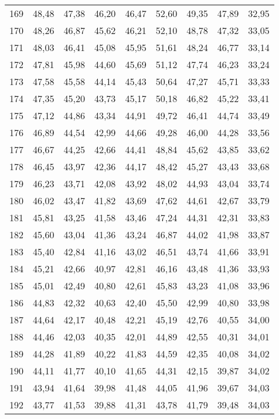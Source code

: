 \begin{longtable}{c c c c c c c c c}
169	& 48,48	& 47,38	& 46,20	& 46,47	& 52,60	& 49,35	& 47,89	& 32,95 \\
170	& 48,26	& 46,87	& 45,62	& 46,21	& 52,10	& 48,78	& 47,32	& 33,05 \\
171	& 48,03	& 46,41	& 45,08	& 45,95	& 51,61	& 48,24	& 46,77	& 33,14 \\
172	& 47,81	& 45,98	& 44,60	& 45,69	& 51,12	& 47,74	& 46,23	& 33,24 \\
173	& 47,58	& 45,58	& 44,14	& 45,43	& 50,64	& 47,27	& 45,71	& 33,33 \\
174	& 47,35	& 45,20	& 43,73	& 45,17	& 50,18	& 46,82	& 45,22	& 33,41 \\
175	& 47,12	& 44,86	& 43,34	& 44,91	& 49,72	& 46,41	& 44,74	& 33,49 \\
176	& 46,89	& 44,54	& 42,99	& 44,66	& 49,28	& 46,00	& 44,28	& 33,56 \\
177	& 46,67	& 44,25	& 42,66	& 44,41	& 48,84	& 45,62	& 43,85	& 33,62 \\
178	& 46,45	& 43,97	& 42,36	& 44,17	& 48,42	& 45,27	& 43,43	& 33,68 \\
179	& 46,23	& 43,71	& 42,08	& 43,92	& 48,02	& 44,93	& 43,04	& 33,74 \\
180	& 46,02	& 43,47	& 41,82	& 43,69	& 47,62	& 44,61	& 42,67	& 33,79 \\
181	& 45,81	& 43,25	& 41,58	& 43,46	& 47,24	& 44,31	& 42,31	& 33,83 \\
182	& 45,60	& 43,04	& 41,36	& 43,24	& 46,87	& 44,02	& 41,98	& 33,87 \\
183	& 45,40	& 42,84	& 41,16	& 43,02	& 46,51	& 43,74	& 41,66	& 33,91 \\
184	& 45,21	& 42,66	& 40,97	& 42,81	& 46,16	& 43,48	& 41,36	& 33,93 \\
185	& 45,01	& 42,49	& 40,80	& 42,61	& 45,83	& 43,23	& 41,08	& 33,96 \\
186	& 44,83	& 42,32	& 40,63	& 42,40	& 45,50	& 42,99	& 40,80	& 33,98 \\
187	& 44,64	& 42,17	& 40,48	& 42,21	& 45,19	& 42,76	& 40,55	& 34,00 \\
188	& 44,46	& 42,03	& 40,35	& 42,01	& 44,89	& 42,55	& 40,31	& 34,01 \\
189	& 44,28	& 41,89	& 40,22	& 41,83	& 44,59	& 42,35	& 40,08	& 34,02 \\
190	& 44,11	& 41,77	& 40,10	& 41,65	& 44,31	& 42,15	& 39,87	& 34,02 \\
191	& 43,94	& 41,64	& 39,98	& 41,48	& 44,05	& 41,96	& 39,67	& 34,03 \\
192	& 43,77	& 41,53	& 39,88	& 41,31	& 43,78	& 41,79	& 39,48	& 34,03 \\

\end{longtable}
